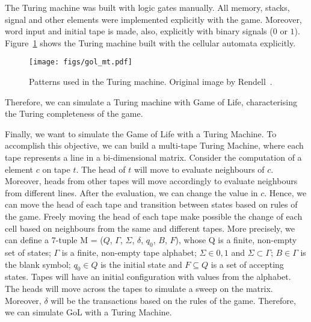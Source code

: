 \documentclass[12pt]{article}
\begin{document}

The Turing machine was built with logic gates manually. All memory, stacks, signal and other elements were implemented explicitly with the game. Moreover, word input and initial tape is made, also, explicitly with binary signals ($0$ or $1$). Figure~\ref{fig:gol_mt} shows the Turing machine built with the cellular automata explicitly.


\begin{figure}[h]
    \centering
    \texttt{[image: figs/gol\_mt.pdf]}
    \caption{Patterns used in the Turing machine. Original image by Rendell~\cite{Rendell:inproc:2011:jul}.}
    \label{fig:gol_mt}
\end{figure}

Therefore, we can simulate a Turing machine with Game of Life, characterising the Turing completeness of the game.

Finally, we want to simulate the Game of Life with a Turing Machine. To accomplish this objective, we can build a multi-tape Turing Machine, where each tape represents a line in a bi-dimensional matrix. Consider the computation of a element $c$ on tape $t$. The head of $t$ will move to evaluate neighbours of $c$. Moreover, heads from other tapes will move accordingly to evaluate neighbours from different lines. After the evaluation, we can change the value in $c$. Hence, we can move the head of each tape and transition between states based on rules of the game. Freely moving the head of each tape make possible the change of each cell based on neighbours from the same and different tapes. More precisely, we can define a 7-tuple M = ($Q$, $\Gamma$, $\Sigma$, $\delta$, $q_0$, $B$, $F$), whose Q is a finite, non-empty set of states; $\Gamma$ is a finite, non-empty tape alphabet; $\Sigma \in {0,1}$ and $\Sigma \subset \Gamma$; $B \in \Gamma$ is the blank symbol; $q_0 \in Q$ is the initial state and $F \subseteq Q$ is a set of accepting states. Tapes will have an initial configuration with values from the alphabet. The heads will move across the tapes to simulate a sweep on the matrix. Moreover, $\delta$ will be the transactions based on the rules of the game. Therefore, we can simulate GoL with a Turing Machine.
\end{document}
